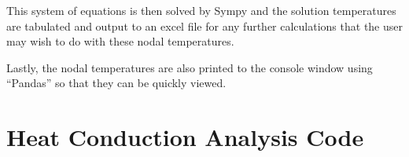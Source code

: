 \documentclass[12pt, stu, floatsintext, hidelinks]{apa7}
\begin{document}
This system of equations is then solved by Sympy and the solution temperatures are tabulated and output to an excel file for any further calculations that the user may wish to do with these nodal temperatures.

Lastly, the nodal temperatures are also printed to the console window using ``Pandas'' so that they can be quickly viewed.

\appendix

\section{Heat Conduction Analysis Code}
\label{software-code}

\end{document}
